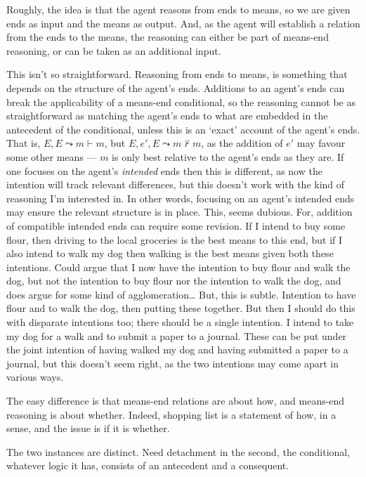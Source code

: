 \documentclass[10pt]{article}
\begin{document}
Roughly, the idea is that the agent reasons from ends to means, so we are given ends as input and the means as output.
And, as the agent will establish a relation from the ends to the means, the reasoning can either be part of means-end reasoning, or can be taken as an additional input.

This isn't so straightforward.
Reasoning from ends to means, is something that depends on the structure of the agent's ends.
Additions to an agent's ends can break the applicability of a means-end conditional, so the reasoning cannot be as straightforward as matching the agent's ends to what are embedded in the antecedent of the conditional, unless this is an `exact' account of the agent's ends.
That is, \(E, E \leadsto m \vdash m\), but \(E, e', E \leadsto m \not\vdash m\), as the addition of \(e'\) may favour some other means --- \(m\) is only best relative to the agent's ends as they are.
If one focuses on the agent's \emph{intended} ends then this is different, as now the intention will track relevant differences, but this doesn't work with the kind of reasoning I'm interested in.
In other words, focusing on an agent's intended ends may ensure the relevant structure is in place.
This, seems dubious.
For, addition of compatible intended ends can require some revision.
If I intend to buy some flour, then driving to the local groceries is the best means to this end, but if I also intend to walk my dog then walking is the best means given both these intentions.
Could argue that I now have the intention to buy flour and walk the dog, but not the intention to buy flour nor the intention to walk the dog, and \citeauthor{Bratman:1987aa} does argue for some kind of agglomeration\dots
But, this is subtle.
Intention to have flour and to walk the dog, then putting these together.
But then I should do this with disparate intentions too; there should be a single intention.
I intend to take my dog for a walk and to submit a paper to a journal.
These can be put under the joint intention of having walked my dog and having submitted a paper to a journal, but this doesn't seem right, as the two intentions may come apart in various ways.

The easy difference is that means-end relations are about how, and means-end reasoning is about whether.
Indeed, shopping list is a statement of how, in a sense, and the issue is if it is whether.



The two instances are distinct.
Need detachment in the second, the conditional, whatever logic it has, consists of an antecedent and a consequent.
\end{document}

